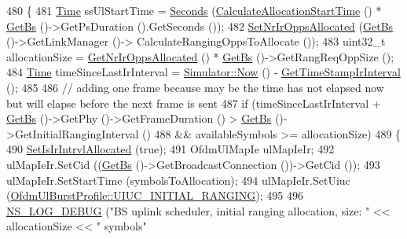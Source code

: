 \begin{DoxyCode}
480 \{
481   \hyperlink{namespacens3_1_1TracedValueCallback_a7ffd3e7c142ffe7c8a1d2db9b8de38ec}{Time} ssUlStartTime = \hyperlink{group__timecivil_ga33c34b816f8ff6628e33d5c8e9713b9e}{Seconds} (\hyperlink{classns3_1_1UplinkSchedulerSimple_a51027095bc6bc9487e2203f532f2ee9d}{CalculateAllocationStartTime} () * 
      \hyperlink{classns3_1_1UplinkScheduler_afe61b7de71d92d2dff1b135744a6ff7e}{GetBs} ()->GetPsDuration ().GetSeconds ());
482   \hyperlink{classns3_1_1UplinkScheduler_a19208ce138c5e13b1a7019a67adef892}{SetNrIrOppsAllocated} (\hyperlink{classns3_1_1UplinkScheduler_afe61b7de71d92d2dff1b135744a6ff7e}{GetBs} ()->GetLinkManager ()->
      CalculateRangingOppsToAllocate ());
483   uint32\_t allocationSize = \hyperlink{classns3_1_1UplinkScheduler_a9a2cbb04c1e84a028fc1545e8f054b80}{GetNrIrOppsAllocated} () * \hyperlink{classns3_1_1UplinkScheduler_afe61b7de71d92d2dff1b135744a6ff7e}{GetBs} ()->GetRangReqOppSize 
      ();
484   \hyperlink{namespacens3_1_1TracedValueCallback_a7ffd3e7c142ffe7c8a1d2db9b8de38ec}{Time} timeSinceLastIrInterval = \hyperlink{classns3_1_1Simulator_ac3178fa975b419f7875e7105be122800}{Simulator::Now} () - 
      \hyperlink{classns3_1_1UplinkScheduler_aa7516e5a55b513a7640035a9783369c7}{GetTimeStampIrInterval} ();
485 
486   \textcolor{comment}{// adding one frame because may be the time has not elapsed now but will elapse before the next frame is
       sent}
487   \textcolor{keywordflow}{if} (timeSinceLastIrInterval + \hyperlink{classns3_1_1UplinkScheduler_afe61b7de71d92d2dff1b135744a6ff7e}{GetBs} ()->GetPhy ()->GetFrameDuration () > 
      \hyperlink{classns3_1_1UplinkScheduler_afe61b7de71d92d2dff1b135744a6ff7e}{GetBs} ()->GetInitialRangingInterval ()
488       && availableSymbols >= allocationSize)
489     \{
490       \hyperlink{classns3_1_1UplinkScheduler_a3eee0d06486678eab4d352a274676d95}{SetIsIrIntrvlAllocated} (\textcolor{keyword}{true});
491       OfdmUlMapIe ulMapIeIr;
492       ulMapIeIr.SetCid ((\hyperlink{classns3_1_1UplinkScheduler_afe61b7de71d92d2dff1b135744a6ff7e}{GetBs} ()->GetBroadcastConnection ())->GetCid ());
493       ulMapIeIr.SetStartTime (symbolsToAllocation);
494       ulMapIeIr.SetUiuc (\hyperlink{classns3_1_1OfdmUlBurstProfile_ae528783c4b3c6700ff49dfd7a555cb3daaea7b6256d4bcd0125f0248c0560c94e}{OfdmUlBurstProfile::UIUC\_INITIAL\_RANGING});
495 
496       \hyperlink{group__logging_ga413f1886406d49f59a6a0a89b77b4d0a}{NS\_LOG\_DEBUG} (\textcolor{stringliteral}{"BS uplink scheduler, initial ranging allocation, size: "} << allocationSize
       << \textcolor{stringliteral}{" symbols"}

\end{DoxyCode}
